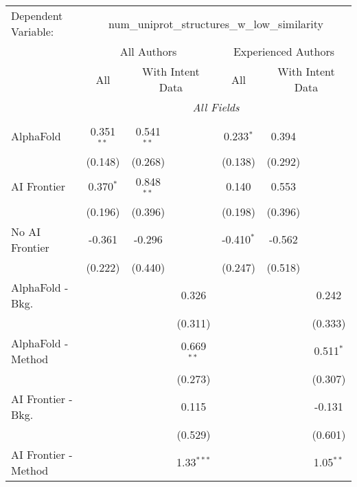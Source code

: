 \begingroup
\centering
\begin{tabular}{lcccccc}
   \tabularnewline \midrule \midrule
   Dependent Variable: & \multicolumn{6}{c}{num\_uniprot\_structures\_w\_low\_similarity}\\
 & \multicolumn{3}{c}{All Authors} & \multicolumn{3}{c}{Experienced Authors} \\
\cmidrule(lr){2-4} \cmidrule(lr){5-7}
 & \multicolumn{1}{c}{All} & \multicolumn{2}{c}{With Intent Data} & \multicolumn{1}{c}{All} & \multicolumn{2}{c}{With Intent Data} \\
\cmidrule(lr){2-2} \cmidrule(lr){3-4} \cmidrule(lr){5-5} \cmidrule(lr){6-7}
 & \multicolumn{6}{c}{\textit{All Fields}} \\ \\
   AlphaFold               & 0.351$^{**}$ & 0.541$^{**}$ &              & 0.233$^{*}$  & 0.394   &   \\   
                           & (0.148)      & (0.268)      &              & (0.138)      & (0.292) &   \\   
   AI Frontier             & 0.370$^{*}$  & 0.848$^{**}$ &              & 0.140        & 0.553   &   \\   
                           & (0.196)      & (0.396)      &              & (0.198)      & (0.396) &   \\   
   No AI Frontier          & -0.361       & -0.296       &              & -0.410$^{*}$ & -0.562  &   \\   
                           & (0.222)      & (0.440)      &              & (0.247)      & (0.518) &   \\   
   AlphaFold - Bkg.        &              &              & 0.326        &              &         & 0.242\\   
                           &              &              & (0.311)      &              &         & (0.333)\\   
   AlphaFold - Method      &              &              & 0.669$^{**}$ &              &         & 0.511$^{*}$\\   
                           &              &              & (0.273)      &              &         & (0.307)\\   
   AI Frontier - Bkg.      &              &              & 0.115        &              &         & -0.131\\   
                           &              &              & (0.529)      &              &         & (0.601)\\   
   AI Frontier - Method    &              &              & 1.33$^{***}$ &              &         & 1.05$^{**}$\\   

\end{tabular}
